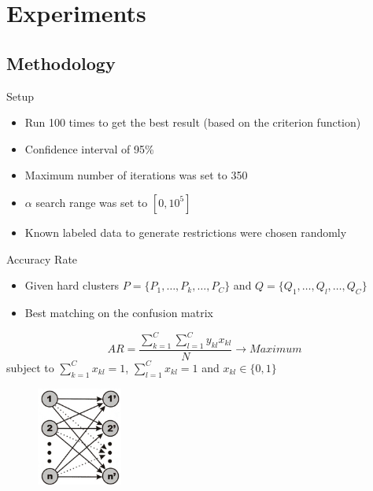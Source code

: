 \documentclass{beamer}
\begin{document}
\section{Experiments}

\subsection{Methodology}

%
%
\begin{frame}{Setup}
	\begin{itemize}
		\item{Run 100 times to get the best result (based on the criterion function)}
		\item{Confidence interval of 95\%}
		\item{Maximum number of iterations was set to 350}
		\item{$\alpha$ search range was set to $[0,10^{5}]$}
		\item{Known labeled data to generate restrictions were chosen randomly}
	\end{itemize}
\end{frame}

\begin{frame}{Accuracy Rate}
	\begin{itemize}
		\item{Given hard clusters $P=\{P_{1},\ldots,P_{k},\ldots,P_{C}\}$ and $Q=\{Q_{1},\ldots,Q_{l},\ldots,Q_{C}\}$}
		\item{Best matching on the confusion matrix}
	\end{itemize}
	\begin{displaymath}
		AR=\frac{\sum_{k=1}^{C}\sum_{l=1}^{C}{y_{kl}}{x_{kl}}}{N} \rightarrow Maximum
	\end{displaymath}
	\pause
	subject to $\sum_{k=1}^{C}x_{kl}=1$, $\sum_{l=1}^{C}x_{kl}=1$ and $x_{kl} \in \{0,1\}$
	\pause
	\begin{figure}
		\centering
		\includegraphics[width=0.25\textwidth]{image/graph.jpg}
	\end{figure}
\end{frame}
\end{document}
